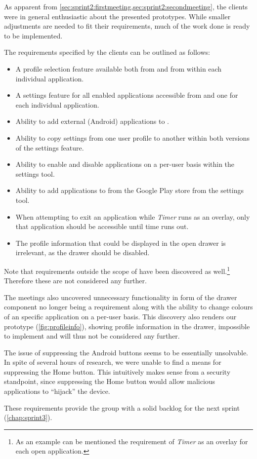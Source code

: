 As apparent from \cref{sec:sprint2:firstmeeting,sec:sprint2:secondmeeting}, the clients were in general enthusiastic about the presented prototypes.
While smaller adjustments are needed to fit their requirements, much of the work done is ready to be implemented.

The requirements specified by the clients can be outlined as follows:

\begin{itemize}
\item A profile selection feature available both from \launcher and from within each individual application.
\item A settings feature for all enabled applications accessible from \launcher and one for each individual application.
\item Ability to add external (Android) applications to \launcher.
\item Ability to copy settings from one user profile to another within both versions of the settings feature.
\item Ability to enable and disable applications on a per-user basis within the \launcher settings tool.
\item Ability to add applications to \launcher from the Google Play store from the \launcher settings tool.
\item When attempting to exit an application while \textit{Timer} runs as an overlay, only that application should be accessible until time runs out.
\item The profile information that could be displayed in the open drawer is irrelevant, as the drawer should be disabled.
\end{itemize}

Note that requirements outside the scope of \launcher have been discovered as well.\footnote{As an example can be mentioned the requirement of \textit{Timer} as an overlay for each open application.}
Therefore these are not considered any further.

The meetings also uncovered unnecessary functionality in form of the drawer component no longer being a requirement along with the ability to change colours of an specific application on a per-user basis.
This discovery also renders our prototype (\cref{fig:profileinfo}), showing profile information in the drawer, impossible to implement and will thus not be considered any further.

The issue of suppressing the Android buttons seems to be essentially unsolvable. In spite of several hours of research, we were unable to find a means for suppressing the Home button. This intuitively makes sense from a security standpoint, since suppressing the Home button would allow malicious applications to ``hijack'' the device.

These requirements provide the group with a solid backlog for the next sprint (\cref{chap:sprint3}).